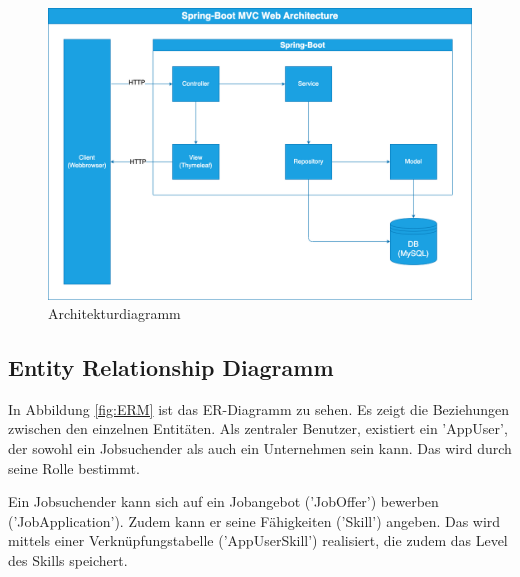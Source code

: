 \documentclass[12pt, letterpaper]{article}
\begin{document}
    \begin{figure}[htbp]
        \includegraphics[width = \linewidth]{Architektur.png}
        \caption{Architekturdiagramm}
        \label{fig:Architektur}
    \end{figure}
    
    \subsection{Entity Relationship Diagramm}

    In Abbildung \ref{fig:ERM} ist das ER-Diagramm zu sehen. Es zeigt die Beziehungen zwischen den einzelnen Entitäten.
    Als zentraler Benutzer, existiert ein 'AppUser', der sowohl ein Jobsuchender als auch ein Unternehmen sein kann.
    Das wird durch seine Rolle bestimmt. 
    
    Ein Jobsuchender kann sich auf ein Jobangebot ('JobOffer') bewerben ('JobApplication'). Zudem kann er 
    seine Fähigkeiten ('Skill') angeben. Das wird mittels einer Verknüpfungstabelle ('AppUserSkill') realisiert, die zudem
    das Level des Skills speichert.
\end{document}
